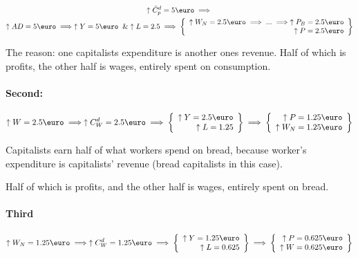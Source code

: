 \documentclass{report}
\begin{document}
\begin{multline}
    \uparrow\bar{C}^d_p=5\text{\euro} \implies \\
\uparrow AD=5\text{\euro} \implies \uparrow Y=5\text{\euro} \And \uparrow L=2.5 \implies \left\{ \begin{array}{r}
    \uparrow W_N = 2.5 \text{\euro}\implies ... \implies \uparrow P_B=2.5\text{\euro} \\ \uparrow P = 2.5 \text{\euro}
\end{array} \right\}
\end{multline}

The reason: one capitalists expenditure is another ones revenue. Half of which is profits, the other half is wages, entirely spent on consumption.

\paragraph{Second:}

\begin{multline}
\uparrow W=2.5\text{\euro} \implies \uparrow C^d_W=2.5\text{\euro} \implies \left\{\begin{array}{r}
     \uparrow Y=2.5\text{\euro} \\
      \uparrow L=1.25
\end{array} \right\} \implies \left\{\begin{array}{r}
     \uparrow P=1.25\text{\euro}  \\
      \uparrow W_N=1.25\text{\euro}
\end{array} \right\}
\end{multline}

Capitalists earn half of what workers spend on bread, because worker's expenditure is capitalists' revenue (bread capitalists in this case).

Half of which is profits, and the other half is wages, entirely spent on bread. 
\paragraph{Third}

\begin{multline}
    \uparrow W_N=1.25\text{\euro} \implies \uparrow C^d_W=1.25\text{\euro} \implies \left\{\begin{array}{r}
        \uparrow Y=1.25\text{\euro}  \\
        \uparrow L=0.625  
    \end{array} \right\} \implies 
    \left\{\begin{array}{r}
         \uparrow P=0.625 \text{\euro} \\
         \uparrow W=0.625\text{\euro} 
    \end{array} \right\}
\end{multline}
\end{document}
